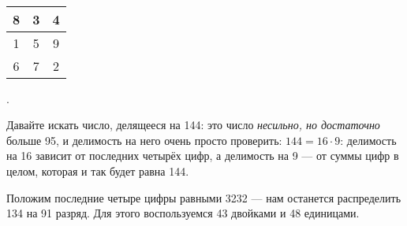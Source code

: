 \begin{itemize}
\itA \ 

\begin{center}
\begin{tabular}{|c|c|c|}
\hline
	8 & 3 & 4 \\
\hline
	1 & 5 & 9 \\
\hline
	6 & 7 & 2 \\
\hline
\end{tabular}
\end{center}

.

\itC Давайте искать число, делящееся на 144: это число {\it несильно, но достаточно} больше 95, и делимость на него очень просто проверить: $144 = 16\cdot 9$: делимость на 16 зависит от последних четырёх цифр, а делимость на 9 — от суммы цифр в целом, которая и так будет равна 144.

Положим последние четыре цифры равными 3232 — нам останется распределить 134 на 91 разряд. Для этого воспользуемся 43 двойками и 48 единицами.
\end{itemize}
